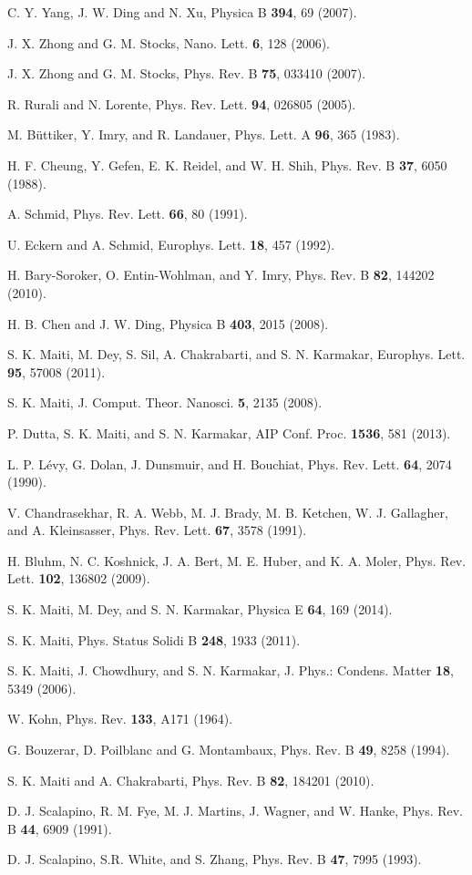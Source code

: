 \documentclass[prb,aps,twocolumn,amsmath,amssymb,floatfix,
superscriptaddress]{revtex4}
\begin{document}
\begin{thebibliography}{99}
 C. Y. Yang, J. W. Ding and N. Xu, Physica B \textbf{394},
69 (2007).

 J. X. Zhong and G. M. Stocks, Nano. Lett. \textbf{6}, 128
(2006).

 J. X. Zhong and G. M. Stocks, Phys. Rev. B \textbf{75},
033410 (2007).

 R. Rurali and N. Lorente, Phys. Rev. Lett. \textbf{94}, 026805 
(2005).

 M. B\"{u}ttiker, Y. Imry, and R. Landauer, Phys. Lett. A
\textbf{96}, 365 (1983).

 H. F. Cheung, Y. Gefen, E. K. Reidel, and W. H. Shih,
Phys. Rev. B \textbf{37}, 6050 (1988).

 A. Schmid, Phys. Rev. Lett. \textbf{66}, 80 (1991).

 U. Eckern and A. Schmid, Europhys. Lett. \textbf{18},
457 (1992).

 H. Bary-Soroker, O. Entin-Wohlman, and Y. Imry, Phys.
Rev. B \textbf{82}, 144202 (2010).

 H. B. Chen and J. W. Ding, Physica B \textbf{403}, 2015
(2008).

 S. K. Maiti, M. Dey, S. Sil, A. Chakrabarti, and S. N.
Karmakar, Europhys. Lett. \textbf{95}, 57008 (2011).

 S. K. Maiti, J. Comput. Theor. Nanosci. \textbf{5}, 2135 (2008).

 P. Dutta, S. K. Maiti, and S. N. Karmakar, AIP Conf. Proc.
\textbf{1536}, 581 (2013). 

 L. P. L\'{e}vy, G. Dolan, J. Dunsmuir, and H. Bouchiat,
Phys. Rev. Lett. \textbf{64}, 2074 (1990).

 V. Chandrasekhar, R. A. Webb, M. J. Brady, M. B. Ketchen,
W. J. Gallagher, and A. Kleinsasser, Phys. Rev. Lett. \textbf{67}, 3578
(1991).

 H. Bluhm, N. C. Koshnick, J. A. Bert, M. E. Huber, and
K. A. Moler, Phys. Rev. Lett. \textbf{102}, 136802 (2009).

 S. K. Maiti, M. Dey, and S. N. Karmakar, Physica E \textbf{64}, 
169 (2014).

 S. K. Maiti, Phys. Status Solidi B \textbf{248}, 1933 (2011). 

 S. K. Maiti, J. Chowdhury, and S. N. Karmakar, 
J. Phys.: Condens. Matter \textbf{18}, 5349 (2006).

 W. Kohn, Phys. Rev. \textbf{133}, A171 (1964).

 G. Bouzerar, D. Poilblanc and G. Montambaux, Phys.
Rev. B \textbf{49}, 8258 (1994).

 S. K. Maiti and A. Chakrabarti, Phys. Rev. B \textbf{82}, 
184201 (2010).

 D. J. Scalapino, R. M. Fye, M. J. Martins, J. Wagner, and
W. Hanke, Phys. Rev. B \textbf{44}, 6909 (1991).

 D. J. Scalapino, S.R. White, and S. Zhang, Phys. Rev. B
\textbf{47}, 7995 (1993).

\end{thebibliography}
  
\end{document}
